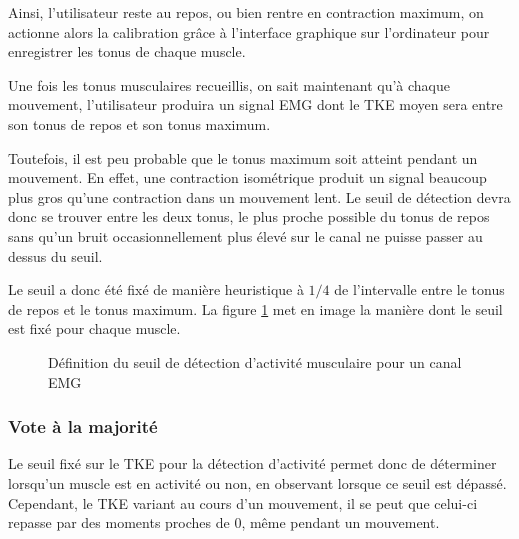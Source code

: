 \documentclass[letterpaper, twoside, 12pt, memoire, creativecommons, hyperref]{thETS}
\begin{document}
Ainsi, l'utilisateur reste au repos, ou bien rentre en contraction maximum, on actionne alors la calibration grâce à l'interface graphique sur l'ordinateur pour enregistrer les tonus de chaque muscle.

Une fois les tonus musculaires recueillis, on sait maintenant qu'à chaque mouvement, l'utilisateur produira un signal EMG dont le TKE moyen sera entre son tonus de repos et son tonus maximum. 

Toutefois, il est peu probable que le tonus maximum soit atteint pendant un mouvement. En effet, une contraction isométrique produit un signal beaucoup plus gros qu'une contraction dans un mouvement lent. Le seuil de détection devra donc se trouver entre les deux tonus, le plus proche possible du tonus de repos sans qu'un bruit occasionnellement plus élevé sur le canal ne puisse passer au dessus du seuil. 

Le seuil a donc été fixé de manière heuristique à $1/4$ de l'intervalle entre le tonus de repos et le tonus maximum. La figure \ref{fig:seuilDetection} met en image la manière dont le seuil est fixé pour chaque muscle.

\begin{figure}
	\centering
	\caption{Définition du seuil de détection d'activité musculaire pour un canal EMG}
	\label{fig:seuilDetection}
\end{figure}

\subsubsection{Vote à la majorité}

Le seuil fixé sur le TKE pour la détection d'activité permet donc de déterminer lorsqu'un muscle est en activité ou non, en observant lorsque ce seuil est dépassé. Cependant, le TKE variant au cours d'un mouvement, il se peut que celui-ci repasse par des moments proches de 0, même pendant un mouvement.
\end{document}
